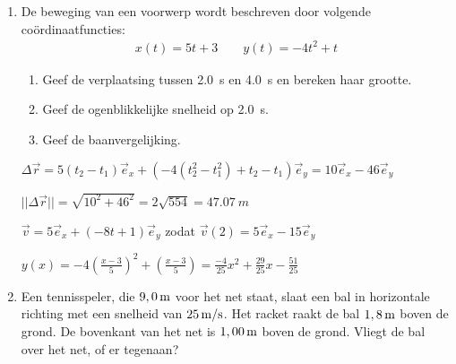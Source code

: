 \begin{enumerate}

	

{buffel}
{veerman}
{2d_mk_1}




\item De beweging van een voorwerp wordt beschreven door volgende co\"ordinaatfuncties:
\begin{eqnarray*}
	x(t)=5t+3\qquad y(t)=-4t^2+t
\end{eqnarray*}
\begin{enumerate}
\item Geef de verplaatsing tussen \SI{2,0}{s} en \SI{4,0}{s} en bereken haar grootte.
\item Geef de ogenblikkelijke snelheid op \SI{2,0}{s}.
\item Geef de baanvergelijking.
\end{enumerate}

\begin{oplossing}
$\Delta\vec{r}=5(t_2-t_1)\vec{e}_x+(-4(t_2^2-t_1^2)+t_2-t_1)\vec{e}_y=10\vec{e}_x-46\vec{e}_y$

$||\Delta\vec{r}||=\sqrt{10^2+46^2}=2\sqrt{554}=\SI{47,07}{m}$

$\vec{v}=5\vec{e}_x+(-8t+1)\vec{e}_y$ zodat $\vec{v}(2)=5\vec{e}_x-15\vec{e}_y$

$y(x)=-4\left(\frac{x-3}{5}\right)^2+\left(\frac{x-3}{5}\right)=\frac{-4}{25}x^{2} + \frac{29}{25}x - \frac{51}{25}$

\end{oplossing}




\item Een tennisspeler, die $9,0\rm\,m$ voor het net staat, slaat
een bal in horizontale richting met een snelheid van $25\rm\,m/s$.
Het racket raakt de bal $1,8\rm\,m$ boven de grond. De bovenkant van
het net is $1,00\rm\,m$ boven de grond. Vliegt de bal over het net,
of er tegenaan?




\end{enumerate}
